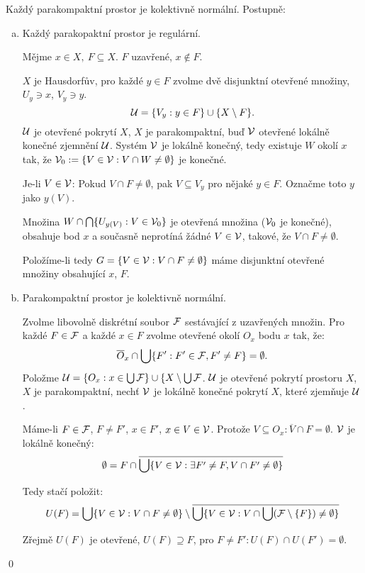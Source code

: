\documentclass[12pt,a4paper]{article}
\newcommand\close{\overline}
\begin{document}
\veta Každý parakompaktní prostor je kolektivně normální.
\dukaz[nekontrolováno] Postupně:
\begin{enumerate}[(a)]
\item Každý parakopaktní prostor je regulární.

	Mějme $x \in X,~F \subseteq X$. $F$ uzavřené, $x \notin F$.

	$X$ je Hausdorfův, pro každé $y \in F$ zvolme dvě disjunktní otevřené
	množiny, $U_y \ni x$, $V_y \ni y$.
		$$\mathcal{ U } = \{V_y : y \in F\} \cup \{X \setminus F\}.$$
	$\mathcal{ U }$ je otevřené pokrytí $X$, $X$ je parakompaktní, buď $\mathcal{ V }$ otevřené
	lokálně konečné zjemnění $\mathcal{ U }$. Systém $\mathcal{ V }$ je lokálně konečný, tedy
	existuje $W$ okolí $x$ tak, že $\mathcal{ V }_0 := \{V \in \mathcal{ V } : V \cap W \neq
	\emptyset\}$ je konečné.

	Je-li $V \in \mathcal{ V }$: Pokud $V \cap F \neq \emptyset$, pak $V \subseteq
	V_y$ pro nějaké $y \in F$. Označme toto $y$ jako $y(V)$.

	Množina $W \cap \bigcap \{U_{y(V)} : V \in \mathcal{ V }_0\}$ je otevřená množina
	($\mathcal{ V }_0$ je konečné), obsahuje bod $x$ a současně neprotíná žádné $V \in
	\mathcal{ V }$, takové, že $V \cap F \neq \emptyset$.
	
	Položíme-li tedy $G = \{V \in \mathcal{ V } : V \cap F \neq \emptyset \}$ máme
	disjunktní otevřené množiny obsahující $x$, $F$.

\item Parakompaktní prostor je kolektivně normální.
	
	Zvolme libovolně diskrétní soubor $\mathcal{ F }$ sestávající z uzavřených množin.
	Pro každé $F \in \mathcal{ F }$ a každé $x \in F$ zvolme otevřené okolí $O_x$ bodu
	$x$ tak, že:
		$$\close O_x \cap \bigcup \{F' : F' \in \p F, F' \neq F\} = \emptyset.$$
	Položme $\mathcal{ U } = \{O_x : x \in \bigcup \mathcal{ F }\} \cup \{X \setminus \bigcup \mathcal{ F }$. $\mathcal{ U }$ je otevřené pokrytí prostoru $X$, $X$ je parakompaktní, nechť $\mathcal{ V }$ je lokálně konečné pokrytí $X$, které zjemňuje $\mathcal{ U }$.

	Máme-li $F \in \mathcal{ F }$, $F \neq F'$, $x \in F'$, $x \in V \in \mathcal{ V }$. Protože
	$V \subseteq O_x: \close V \cap F = \emptyset$. $\mathcal{ V }$ je lokálně konečný:
		$$\emptyset = F \cap \close{\bigcup \{V \in \p V: \exists F' \neq F, V
		\cap F' \neq \emptyset\}}$$

	Tedy stačí položit:
		$$U(F) = \bigcup \{V \in \p V: V \cap F \neq \emptyset\} \setminus
		\close{\bigcup \{V \in \p V : V \cap \bigcup (\p F \setminus \{F\}) \neq
		\emptyset \}}$$

	Zřejmě $U(F)$ je otevřené, $U(F) \supseteq F$, pro $F \neq F': U(F) \cap
	U(F') = \emptyset$.

\end{enumerate}
\qed
\end{document}
